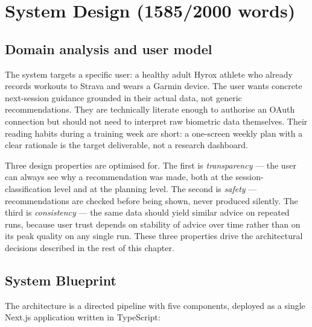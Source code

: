 
\chapter{System Design (1585/2000 words)}
\label{ch:design}

\section{Domain analysis and user model}

The system targets a specific user: a healthy adult Hyrox athlete who already records workouts to Strava and wears a Garmin device. The user wants concrete next-session guidance grounded in their actual data, not generic recommendations. They are technically literate enough to authorise an OAuth connection but should not need to interpret raw biometric data themselves. Their reading habits during a training week are short: a one-screen weekly plan with a clear rationale is the target deliverable, not a research dashboard.

Three design properties are optimised for. The first is \emph{transparency} --- the user can always see why a recommendation was made, both at the session-classification level and at the planning level. The second is \emph{safety} --- recommendations are checked before being shown, never produced silently. The third is \emph{consistency} --- the same data should yield similar advice on repeated runs, because user trust depends on stability of advice over time rather than on its peak quality on any single run. These three properties drive the architectural decisions described in the rest of this chapter.

\section{System Blueprint}

The architecture is a directed pipeline with five components, deployed as a single Next.js application written in TypeScript:

